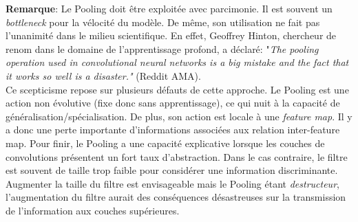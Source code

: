 \noindent \textbf{Remarque}: Le Pooling doit être exploitée avec parcimonie. Il est souvent un \textit{bottleneck} pour la vélocité du modèle. De même, son utilisation ne fait pas l'unanimité dans le milieu scientifique. En effet, Geoffrey Hinton, chercheur de renom dans le domaine de l'apprentissage profond, a déclaré: "\textit{The pooling operation used in convolutional neural networks is a big mistake and the fact that it works so well is a disaster."} (Reddit AMA).\\

\noindent Ce scepticisme repose sur plusieurs défauts de cette approche. Le Pooling est une action non évolutive (fixe donc sans apprentissage), ce qui nuit à la capacité de généralisation/spécialisation. De plus, son action est locale à une \textit{feature map}. Il y a donc une perte importante d'informations associées aux relation inter-feature map. Pour finir, le Pooling a une capacité explicative lorsque les couches de convolutions présentent un fort taux d'abstraction. Dans le cas contraire, le filtre est souvent de taille trop faible pour considérer une information discriminante. Augmenter la taille du filtre est envisageable mais le Pooling étant \textit{destructeur}, l'augmentation du filtre aurait des conséquences désastreuses sur la transmission de l'information aux couches supérieures.\\

